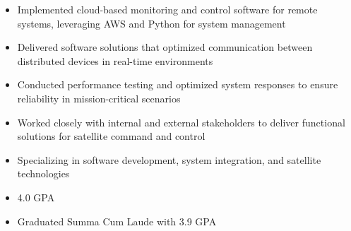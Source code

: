 \par\smallskip
\begin{minipage}{13.75cm}
  \begin{minipage}{6.5cm}
    \begin{itemize}
      \item Implemented cloud-based monitoring and control software for remote systems, leveraging AWS and Python for system management
      \item Delivered software solutions that optimized communication between distributed devices in real-time environments
    \end{itemize}
  \end{minipage}
  \hfill
  \begin{minipage}{6.5cm}
    \begin{itemize}
      \item Conducted performance testing and optimized system responses to ensure reliability in mission-critical scenarios
      \item Worked closely with internal and external stakeholders to deliver functional solutions for satellite command and control
    \end{itemize}
  \end{minipage}
\end{minipage}

\par\bigskip
{}
\begin{itemize}
  \item Specializing in software development, system integration, and satellite technologies
  \item 4.0 GPA
\end{itemize}
\divider

\begin{itemize}
  \item Graduated Summa Cum Laude with 3.9 GPA
\end{itemize}


